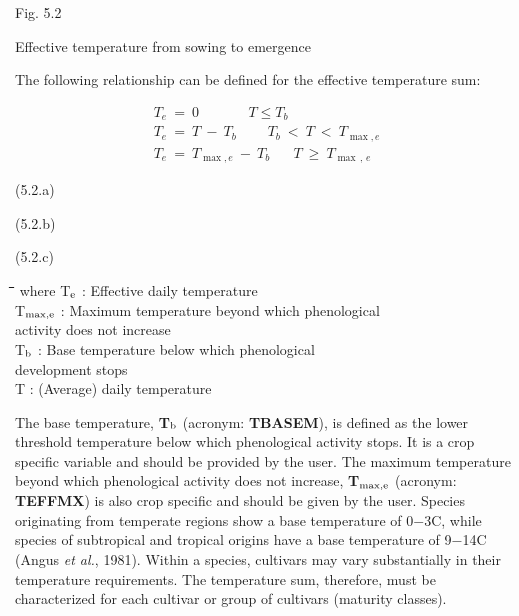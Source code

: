 \documentclass[11pt]{article}
\begin{document}
\bigskip
\bigskip
\bigskip
\bigskip
\bigskip
\bigskip
\bigskip
\bigskip
\bigskip
\bigskip
\bigskip
\bigskip
\bigskip
\bigskip
\bigskip
\bigskip
\bigskip
Fig. 5.2 
\testlastline

\begin{indenting}{2.54cm}
Effective temperature from sowing to emergence
\end{indenting}
 The following relationship can be defined for the effective temperature sum:

\begin{eqnarray*}
T _{e} ~=~0~~~~~~~~~~~~~~~~T\le T _{b} \nonumber  \\
T _{e} ~=~ T~-~ T _{b} ~~~~~~~~~~T _{b} ~<~T ~ < ~T _{\max ,e} \nonumber  \\
T _{e} ~=~ T _{\max ,e} ~-~ T _{b} ~\,\, ~~~~~T~\ge ~ T _{\max \, ,\, e}
\end{eqnarray*}

 \bigskip
\strut\hfill (5.2.a)\\
\strut\hfill (5.2.b)\\
\strut\hfill (5.2.c)
\nwln
\begin{tabbing}
\hspace{1.27cm}\=\hspace{1.27cm}\=\hspace{1.27cm}\=\hspace{1.27cm}\=%
\hspace{1.27cm}\=\hspace{1.27cm}\=\hspace{1.27cm}\=\hspace{1.27cm}\=%
\hspace{1.27cm}\=\hspace{1.27cm}\=\kill
where\> T$_{{\rm e}}$\> : Effective daily tempera\-ture\> \> \> \> \> \> \> \> [\degrees C]\\
\>T$_{{\rm max,e}}$\> : Maximum temperature beyond which phenological \\
\>\>   activity does not increase\> \> \> \> \> \> \> \> [\degrees C]\\
\>T$_{{\rm b}}$\> : Base temperature below which phenological \\
\>\>   development stops\> \> \> \> \> \> \> \> [\degrees C]\\
\>T \> : (Average) daily temperature\> \> \> \> \> \> \> \> [\degrees C]
\end{tabbing}

\bigskip
The base temperature, {\bf T$_{{\rm b}}$} (acronym: {\bf TBASEM}), is defined as the lower threshold
tempera\-ture below which phenological activity stops. It is a crop specific variable and
should be provided by the user. The maximum temperature beyond which phenological
activity does not increase, {\bf T$_{{\rm max,e}}$} (acronym: {\bf TEFFMX}) is also crop specific and should be
given by the user. Species originat\-ing from temperate regions show a base temperature of
0$-$3\degrees C, while species of sub\-tropical and tropical origins have a base temperature of
9$-$14\degrees C (Angus {\it et al.\/}, 1981). Within a species, cultivars may vary substantially in their
temperature requirements. The tempera\-ture sum, therefore, must be characterized for
each cultivar or group of cultivars (maturity classes).   
\end{document}
